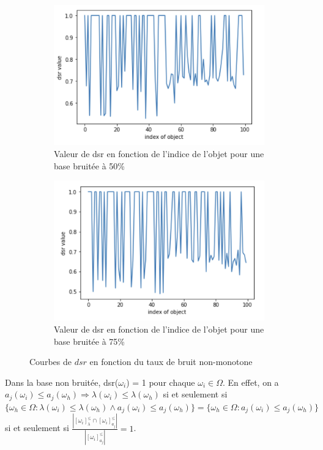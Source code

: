 \documentclass[a4paper]{article}
\begin{document}
\begin{figure}[H]
    \begin{subfigure}[c]{0.46\textwidth}
	    \centering 
	    \includegraphics[width=\textwidth]{images/dsr_50.png}
        \caption{Valeur de dsr en fonction de l'indice de l'objet pour une base
        bruitée à 50\%}
        \label{img:dsr50}
    \end{subfigure}
    \begin{subfigure}[c]{0.46\textwidth}
    	\centering
    	\includegraphics[width=\textwidth]{images/dsr_75.png}
        \caption{Valeur de dsr en fonction de l'indice de l'objet pour une base
        bruitée à 75\%}
        \label{img:dsr75}
    \end{subfigure}
\caption{Courbes de $dsr$ en fonction du taux de bruit non-monotone}
\end{figure}

Dans la base non bruitée, dsr($\omega_i$) = 1 pour chaque $\omega_i \in \Omega$.
En effet, on a $a_j(\omega_i) \leq a_j(\omega_h) \Rightarrow \lambda(\omega_i)
\leq \lambda(\omega_h)$ si et seulement si $\{\omega_h \in \Omega :
\lambda(\omega_i) \leq \lambda(\omega_h) \land a_j(\omega_i) \leq
a_j(\omega_h)\} = \{\omega_h \in \Omega : a_j(\omega_i) \leq a_j(\omega_h)\}$ si
et seulement si $\frac{| [\omega_i]^{\leq}_{\lambda} \cap
[\omega_i]^{\leq}_{a_j}|}{| [\omega_i]^{\leq}_{a_j} |} = 1 $.
\end{document}
